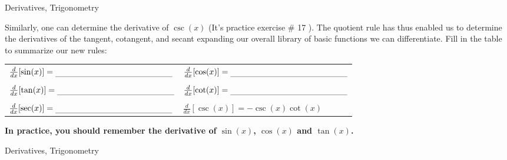 
\begin{tagblock}{Derivatives, Trigonometry}
\begin{question}
	






Similarly, one can determine the derivative of $\csc(x)$ (It's practice exercise \# 17 ).  The quotient rule has thus enabled us to determine the derivatives of the tangent, cotangent, and secant expanding our overall library of basic functions we can differentiate. Fill in the table to summarize our new rules:
\bigskip

\begin{tabular}{ll}
$\frac{d}{dx}[\sin(x)] = \rule[-0.1cm]{5cm}{0.01cm}$  & $\frac{d}{dx}[\cos(x)] = \rule[-0.1cm]{5cm}{0.01cm} $ \\ \\
$\frac{d}{dx}[\tan(x)] = \rule[-0.1cm]{5cm}{0.01cm}$  & $\frac{d}{dx}[\cot(x)] = \rule[-0.1cm]{5cm}{0.01cm} $ \\ \\
$\frac{d}{dx}[\sec(x)] =  \rule[-0.1cm]{5cm}{0.01cm}$  & $\frac{d}{dx}[\csc(x)] = -\csc(x) \cot(x) $ \\
\end{tabular}

\bigskip
\textbf{In practice, you should remember the derivative of $\sin(x)$, $\cos(x)$ and $\tan(x)$.  }








	









	
	
\begin{tags}
	    Derivatives, Trigonometry
\end{tags}
	
\begin{diary}
\end{diary}
	
\begin{solution}
	   
\end{solution}
	
\end{question}

\end{tagblock}

